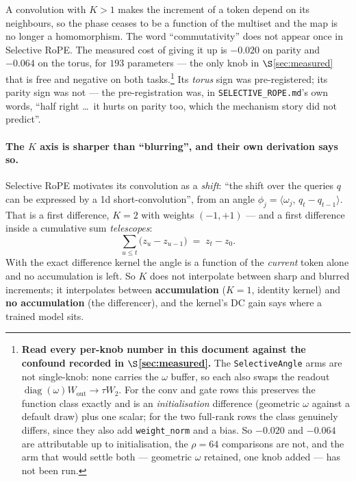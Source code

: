 \documentclass[11pt]{article}
\begin{document}
A convolution with $K>1$ makes the increment of a token depend on its neighbours,
so the phase ceases to be a function of the multiset and the map is no longer a
homomorphism. The word ``commutativity'' does not appear once in Selective RoPE.
The measured cost of giving it up is $-0.020$ on parity and $-0.064$ on the torus,
for $193$ parameters --- the only knob in $\S$\ref{sec:measured} that is free and negative on both
tasks.\footnote{\textbf{Read every per-knob number in this document against the
confound recorded in $\S$\ref{sec:measured}.} The \texttt{SelectiveAngle} arms are
not single-knob: none carries the $\omega$ buffer, so each also swaps the readout
$\operatorname{diag}(\omega)W_{\mathrm{out}}\to\tau W_2$. For the conv and gate rows
this preserves the function class exactly and is an \emph{initialisation} difference
(geometric $\omega$ against a default draw) plus one scalar; for the two full-rank
rows the class genuinely differs, since they also add \texttt{weight\_norm} and a
bias. So $-0.020$ and $-0.064$ are attributable up to initialisation, the $\rho=64$
comparisons are not, and the arm that would settle both --- geometric $\omega$
retained, one knob added --- has not been run.} Its \emph{torus} sign was pre-registered; its parity sign was not --- the
pre-registration was, in \texttt{SELECTIVE\_ROPE.md}'s own words, ``half right
\dots\ it hurts on parity too, which the mechanism story did not predict''.

\paragraph{The $K$ axis is sharper than ``blurring'', and their own derivation says
so.} Selective RoPE motivates its convolution as a \emph{shift}: ``the shift over
the queries $q$ can be expressed by a 1d short-convolution'', from an angle
$\phi_j = \langle \omega_j,\, q_t - q_{t-1}\rangle$. That is a first difference,
$K=2$ with weights $(-1,+1)$ --- and a first difference inside a cumulative sum
\emph{telescopes}:
\begin{equation}
  \sum_{u\le t}\big(z_u - z_{u-1}\big) \;=\; z_t - z_0 .
\end{equation}
With the exact difference kernel the angle is a function of the \emph{current}
token alone and no accumulation is left. So $K$ does not interpolate between sharp
and blurred increments; it interpolates between \textbf{accumulation} ($K=1$,
identity kernel) and \textbf{no accumulation} (the differencer), and the kernel's
DC gain says where a trained model sits.
\end{document}
